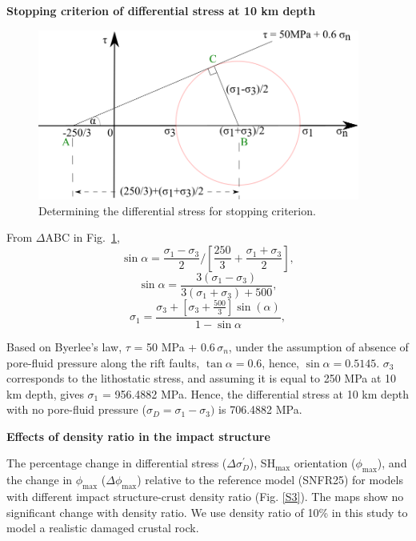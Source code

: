 \documentclass[draft,jgrga]{agutexSI2019}
\begin{document}
\begin{article}
\vspace{10mm} %

\noindent\textbf{Stopping criterion of differential stress at 10 km depth}
\vspace{10mm} %

\begin{figure}[ht]
\includegraphics[width=25pc]{Figures/Calc_diff_stress.png}
\caption{Determining the differential stress for stopping criterion.}
\label{S2}
\end{figure}

\vspace{5mm} %

From $\Delta$ABC in Fig.~\ref{S2},
\[
 \sin \alpha = \frac{\sigma_{1}-\sigma_{3}}{2} / \left[\frac{250}{3} + \frac{\sigma_{1}+\sigma_{3}}{2} \right],
\]
%
\[
 \sin \alpha = \frac{3(\sigma_{1}-\sigma_{3})}{3(\sigma_{1}+\sigma_{3})+500},
\]
%
\[
 \sigma_{1} = \frac{\sigma_{3}+[\sigma_{3}+\frac{500}{3}] \sin(\alpha)}{1-\sin \alpha},
\]

Based on Byerlee's law, $\tau$  = 50 MPa + 0.6$\,\sigma_n$, under the assumption of absence of pore-fluid pressure along the rift faults, $\tan \alpha = 0.6$, hence, $\sin \alpha = 0.5145$. $\sigma_{3}$ corresponds to the lithostatic stress, and assuming it is equal to 250 MPa at 10 km depth, gives $\sigma_{1}$ = 956.4882 MPa. Hence, the differential stress at 10 km depth with no pore-fluid pressure ($\sigma_{D} = \sigma_{1} - \sigma_{3})$ is 706.4882 MPa. 

\vspace{10mm} %

\noindent\textbf{Effects of density ratio in the impact structure}

The percentage change in differential stress ($\Delta\sigma_{D}^{\prime}$), SH$_{\max}$ orientation ($\phi_{\max}$), and the change in $\phi_{\max}$ ($\Delta\phi_{\max}$) relative to the reference model (SNFR25) for models with different impact structure-crust density ratio (Fig. \ref{S3}).  The maps show no significant change with density ratio. We use density ratio of 10\% in this study to model a realistic damaged crustal rock. 
\vspace{10mm} %


\end{article}
\end{document}
